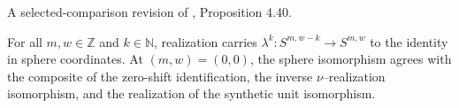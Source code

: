 \begin{theorem}
\label{frontier:Literature:00344e96581e}
A selected-comparison revision of \cite{Pst}, Proposition 4.40.\par

For all $m,w\in\mathbb Z$ and $k\in\mathbb N$, realization carries $\lambda^k:S^{m,w-k}\to S^{m,w}$ to the identity in sphere coordinates. At $(m,w)=(0,0)$, the sphere isomorphism agrees with the composite of the zero-shift identification, the inverse $\nu$--realization isomorphism, and the realization of the synthetic unit isomorphism.
\end{theorem}


